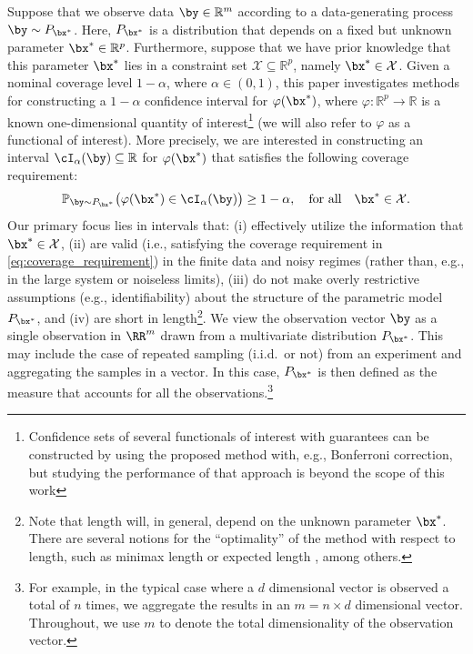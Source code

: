 \documentclass[11pt]{article}
\numberwithin{equation}{section}
\numberwithin{figure}{section}
\begin{document}
Suppose that we observe data $\by \in \mathbb{R}^m$ according to a data-generating process $\by \sim P_{\bx^*}$. Here, $P_{\bx^*}$ is a distribution that depends on a fixed but unknown parameter $\bx^* \in \mathbb{R}^p$. 
Furthermore, suppose that we have prior knowledge that this parameter $\bx^*$ lies in a constraint set $\mathcal{X} \subseteq \mathbb{R}^p$, namely $\bx^* \in \mathcal{X}$. 
Given a nominal coverage level $1-\alpha$, where $\alpha \in (0,1)$, this paper investigates methods for constructing a $1-\alpha$ confidence interval for $\varphi(\bx^*)$, where $\varphi: \mathbb{R}^p \to \mathbb{R}$ is a known one-dimensional quantity of interest\footnote{Confidence sets of several functionals of interest with guarantees can be constructed by using the proposed method with, e.g., Bonferroni correction, but studying the performance of that approach is beyond the scope of this work}
(we will also refer to $\varphi$ as a functional of interest).
More precisely, we are interested in constructing an interval 
$\cI_\alpha(\by) \subseteq \mathbb{R}$ 
for $\varphi(\bx^*)$ that satisfies the following coverage requirement: 
\begin{equation}
    \label{eq:coverage_requirement}
    \mathbb{P}_{\by \sim P_{\bx^*}} \big(\varphi(\bx^*) \in \cI_\alpha(\by) \big) \geq 1 - \alpha, \quad \text{for all} \quad \bx^* \in \mathcal{X}.
\end{equation}
Our primary focus lies in intervals that: (i) effectively utilize the information that $\bx^* \in \mathcal X$, (ii) are valid (i.e., satisfying the coverage requirement in \eqref{eq:coverage_requirement}) in the finite data and noisy regimes (rather than, e.g., in the large system or noiseless limits), (iii) do not make overly restrictive assumptions (e.g., identifiability) about the structure of the parametric model $P_{\bx^*}$, and (iv) are short in length\footnote{Note that length will, in general, depend on the unknown parameter $\bx^*$. 
There are several notions for the ``optimality'' of the method with respect to length, such as minimax length \cite{donoho1994statistical,schafer2009constructing} or expected length \cite{stanley_unfolding}, among others.}.
We view the observation vector $\by$ as a single observation in $\RR^{m}$ drawn from a multivariate distribution $P_{\bx^*}$. 
This may include the case of repeated sampling (i.i.d.\ or not) from an experiment and aggregating the samples in a vector. 
In this case, $P_{\bx^*}$ is then defined as the measure that accounts for all the observations.\footnote{For example, in the typical case where a $d$ dimensional vector is observed a total of $n$ times, we aggregate the results in an $m = n \times d$ dimensional vector. 
Throughout, we use $m$ to denote the total dimensionality of the observation vector.}
\end{document}
